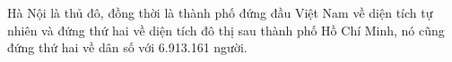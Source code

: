 \documentclass{article}
\begin{document}
Hà Nội là thủ đô, đồng thời là thành phố đứng đầu Việt Nam về diện
tích tự nhiên và đứng thứ hai về diện tích đô thị sau thành phố Hồ Chí
Minh, nó cũng đứng thứ hai về dân số với 6.913.161 người.
\end{document}
